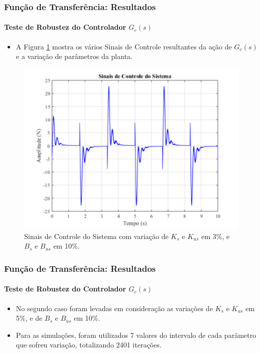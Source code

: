 \documentclass{beamer}
\begin{document}
\begin{frame}
\frametitle{Função de Transferência: Resultados}
\framesubtitle{Teste de Robustez do Controlador $G_c(s)$}
\begin{itemize}
\item A Figura \ref{sinalcontroleIntervalar} mostra os vários Sinais de Controle resultantes da ação de $G_c(s)$ e a variação de parâmetros da planta.
\end{itemize}
\begin{figure}[H]
  \centering
\includegraphics[width=.5\columnwidth]{./imagens/sinal_de_controle_variando_Ks_Kus_Bs_Bus_controlador_sem_robustez.pdf}
  \renewcommand{\figurename}{Fig. 11}
    \caption{Sinais de Controle do Sistema com variação de $K_s$ e $K_{us}$ em 3\%, e $B_s$ e $B_{us}$ em 10\%.}
  \label{sinalcontroleIntervalar}
\end{figure}
\end{frame}

\begin{frame}
\frametitle{Função de Transferência: Resultados}
\framesubtitle{Teste de Robustez do Controlador $G_c(s)$}
\begin{itemize}
\item No segundo caso foram levadas em consideração as variações de $K_s$ e $K_{us}$ em 5\%, e de $B_s$ e $B_{us}$ em 10\%.
\item Para as simulações, foram utilizados 7 valores do intervalo de cada parâmetro que sofreu variação, totalizando 2401 iterações.
\end{itemize}
\end{frame}
\end{document}
